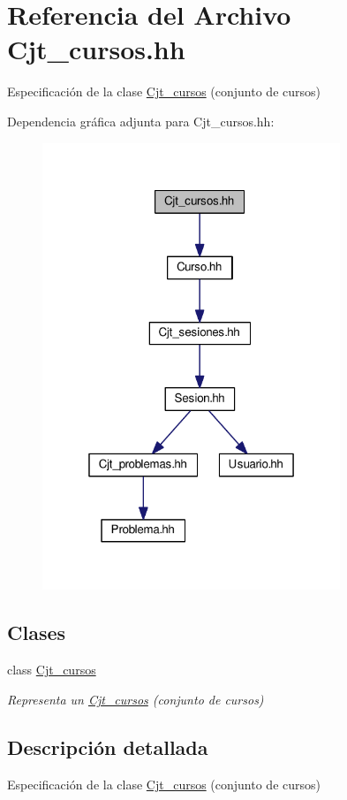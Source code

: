 \hypertarget{_cjt__cursos_8hh}{}\section{Referencia del Archivo Cjt\+\_\+cursos.\+hh}
\label{_cjt__cursos_8hh}


Especificación de la clase \mbox{\hyperlink{class_cjt__cursos}{Cjt\+\_\+cursos}} (conjunto de cursos)  


Dependencia gráfica adjunta para Cjt\+\_\+cursos.\+hh\+:
\nopagebreak
\begin{figure}[H]
\begin{center}
\leavevmode
\includegraphics[width=253pt]{_cjt__cursos_8hh__incl}
\end{center}
\end{figure}
\subsection*{Clases}
\begin{DoxyCompactItemize}
\item 
class \mbox{\hyperlink{class_cjt__cursos}{Cjt\+\_\+cursos}}
\begin{DoxyCompactList}\small\item\em Representa un \mbox{\hyperlink{class_cjt__cursos}{Cjt\+\_\+cursos}} (conjunto de cursos) \end{DoxyCompactList}\end{DoxyCompactItemize}


\subsection{Descripción detallada}
Especificación de la clase \mbox{\hyperlink{class_cjt__cursos}{Cjt\+\_\+cursos}} (conjunto de cursos) 

